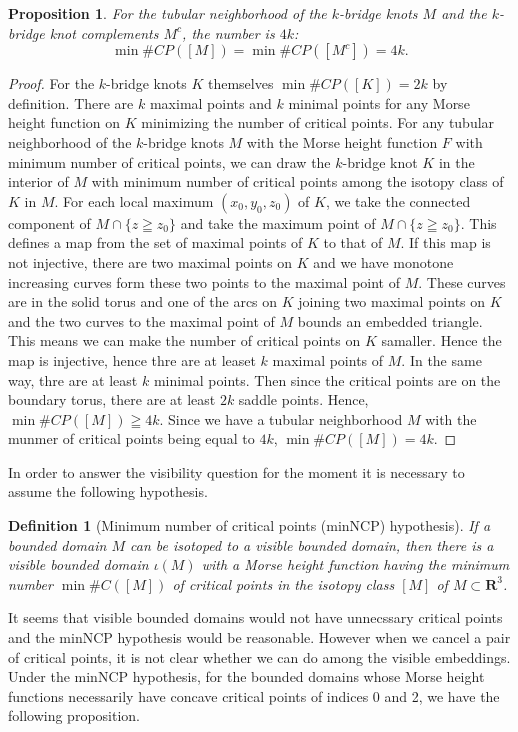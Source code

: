 \documentclass{amsart}
\newtheorem{proposition}[theorem]{Proposition}
\newtheorem{definition}[theorem]{Definition}
\numberwithin{equation}{section}
\newcommand{\RR}{{\boldsymbol{R}}}
\begin{document}
\begin{proposition}\label{prop:k-bridge}
For the tubular neighborhood of the $k$-bridge knots $M$  and the $k$-bridge knot complements $M^c$, the number is $4k$: $$\min\#CP([M])=\min\#CP([M^c])=4k.$$
\end{proposition}
\begin{proof}
For the $k$-bridge knots $K$ themselves $\min\#CP([K])=2k$ by definition.
There are $k$ maximal points and $k$ minimal points for any Morse height function on $K$ minimizing the number of critical points.  
For any tubular neighborhood of the $k$-bridge knots $M$ with the Morse height function $F$ with minimum number of critical points, we can draw the $k$-bridge knot $K$ in the interior of $M$ with minimum number of critical points among the isotopy class of $K$ in $M$. 
For each local maximum $(x_0,y_0,z_0)$ of $K$, we take the connected component of $M\cap \{z\geqq z_0\}$ and take the maximum point of $M\cap \{z\geqq z_0\}$.
This defines a map from the set of maximal points of $K$ to that of $M$. If this map is not injective, there are two maximal points on $K$ and  we have monotone increasing curves form these two points to the maximal point of $M$. These curves are in the solid torus and  one of the arcs on $K$ joining two maximal points on $K$ and the two curves to the maximal point of $M$ bounds an embedded triangle. This means we can make the number of critical points on $K$ samaller. Hence the map is injective, hence thre are at leaset $k$ maximal points of $M$.  In the same way, thre are at least $k$ minimal points. Then since the critical points are on the boundary torus, there are at least $2k$ saddle points. Hence, $\min\#CP([M])\geqq 4k$. Since we have a tubular neighborhood $M$ with the munmer of critical points being equal to $4k$, $\min\#CP([M])=4k$.
\end{proof}


In order to answer the visibility question for the moment it is necessary to 
assume the following hypothesis.


\begin{definition}[Minimum number of critical points (minNCP) hypothesis]
If a bounded domain $M$ can be isotoped to a visible bounded domain, then there is a {\it visible} bounded domain $\iota(M)$ with a Morse height function having the minimum number $\min\# C([M])$ of critical points in the isotopy class $[M]$ of $M\subset \RR^3$.
\end{definition}

It seems that visible bounded domains would not have unnecssary critical points and the minNCP hypothesis would be reasonable. However when we cancel a pair of critical points, it is not clear whether we can do among the visible embeddings. 
Under the minNCP hypothesis,
for the bounded domains whose Morse height functions necessarily have concave critical points of indices 0 and 2, we have the following proposition.
\end{document}
